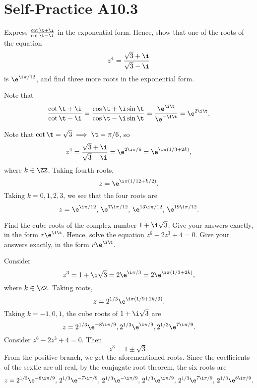 \section{Self-Practice A10.3}

\begin{problem}
    Express $\frac{\cot \t + \i}{\cot \t - \i}$ in the exponential form. Hence, show that one of the roots of the equation \[z^4 = \frac{\sqrt3 + \i}{\sqrt3 - \i}\] is $\e^{\i \pi/12}$, and find three more roots in the exponential form.
\end{problem}
\begin{solution}
    Note that \[\frac{\cot \t + \i}{\cot \t - \i} = \frac{\cos \t + \i \sin \t}{\cos \t - \i \sin \t} = \frac{\e^{\i\t}}{\e^{-\i\t}} = \e^{2\i \t}.\]

    Note that $\cot \t = \sqrt{3} \implies \t = \pi/6$, so \[z^4 = \frac{\sqrt3 + \i}{\sqrt3 - \i} = \e^{2\i \pi/6} = \e^{\i \pi (1/3 + 2k)},\] where $k \in \ZZ$. Taking fourth roots, \[z = \e^{\i \pi (1/12 + k/2)}.\] Taking $k = 0, 1, 2, 3$, we see that the four roots are \[z = \e^{\i \pi /12}, \, \e^{7\i \pi/12}, \, \e^{13\i \pi/12}, \, \e^{19\i \pi/12}.\]
\end{solution}

\begin{problem}
    Find the cube roots of the complex number $1 + \i \sqrt3$. Give your answers exactly, in the form $r\e^{\i \t}$. Hence, solve the equation $z^6 - 2z^3 + 4 = 0$. Give your answers exactly, in the form $r\e^{\i \t}$.
\end{problem}
\begin{solution}
    Consider \[z^3 = 1 + \i \sqrt{3} = 2 \e^{\i \pi /3} = 2\e^{\i \pi (1/3 + 2k)},\] where $k \in \ZZ$. Taking roots, \[z = 2^{1/3} \e^{\i \pi (1/9 + 2k/3)}.\] Taking $k = -1, 0, 1$, the cube roots of $1 + \i \sqrt{3}$ are \[z = 2^{1/3} \e^{-8\i \pi /9}, 2^{1/3} \e^{\i \pi / 9}, 2^{1/3} \e^{7\i \pi/9}.\] Consider $z^6 - 2z^3 + 4 = 0$. Then \[z^3 = 1 \pm \sqrt{3}.\] From the positive branch, we get the aforementioned roots. Since the coefficients of the sextic are all real, by the conjugate root theorem, the six roots are \[z = 2^{1/3} \e^{-8 \i \pi / 9}, \, 2^{1/3} \e^{-7\i \pi/9}, \, 2^{1/3} \e^{-\i \pi /9}, \, 2^{1/3} \e^{\i \pi / 9}, \, 2^{1/3} \e^{7\i \pi/9}, \, 2^{1/3} \e^{8\i \pi /9}.\]
\end{solution}

